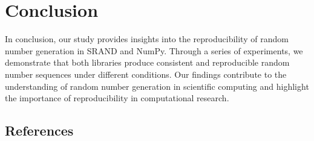 \documentclass{article}
\begin{document}
\section{Conclusion}

In conclusion, our study provides insights into the reproducibility of random number generation in SRAND and NumPy. Through a series of experiments, we demonstrate that both libraries produce consistent and reproducible random number sequences under different conditions. Our findings contribute to the understanding of random number generation in scientific computing and highlight the importance of reproducibility in computational research.

\subsection{References}
\end{document}
